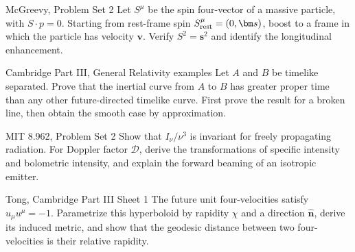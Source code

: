 \begin{exercise}{McGreevy, Problem Set 2}
Let \(S^\mu\) be the spin four-vector of a massive particle, with
\(S\cdot p=0\).  Starting from rest-frame spin
\(S^\mu_{\rm rest}=(0,\bm s)\), boost to a frame in which the particle has
velocity \(\bm v\).  Verify \(S^2=\bm s^2\) and identify the longitudinal
enhancement.
\end{exercise}

\begin{exercise}{Cambridge Part III, General Relativity examples}
Let \(A\) and \(B\) be timelike separated.  Prove that the inertial curve from
\(A\) to \(B\) has greater proper time than any other future-directed timelike
curve.  First prove the result for a broken line, then obtain the smooth case
by approximation.
\end{exercise}

\begin{exercise}{MIT 8.962, Problem Set 2}
Show that \(I_\nu/\nu^3\) is invariant for freely propagating radiation.  For
Doppler factor \(\mathcal D\), derive the transformations of specific
intensity and bolometric intensity, and explain the forward beaming of an
isotropic emitter.
\end{exercise}

\begin{exercise}{Tong, Cambridge Part III Sheet 1}
The future unit four-velocities satisfy \(u_\mu u^\mu=-1\).  Parametrize this
hyperboloid by rapidity \(\chi\) and a direction \(\hat{\bm n}\), derive its
induced metric, and show that the geodesic distance between two four-velocities
is their relative rapidity.
\end{exercise}
